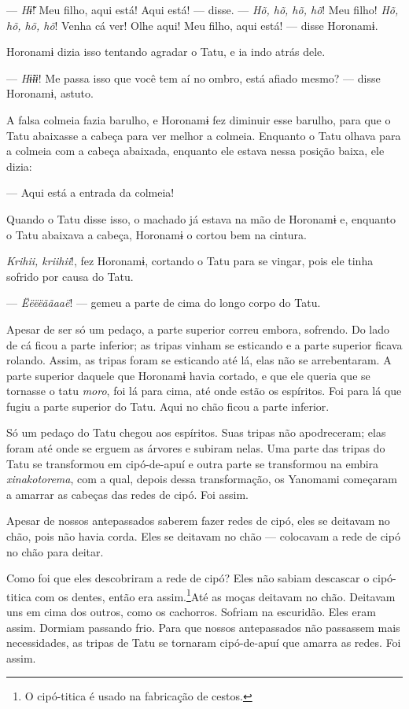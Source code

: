 --- \textit{Hɨ̃}! Meu filho, aqui está! Aqui está! --- disse. --- \textit{Hõ, hõ, hõ,
hõ}! Meu filho! \textit{Hõ, hõ, hõ, hõ}! Venha cá ver! Olhe aqui! Meu filho, aqui
está! --- disse Horonamɨ. 

Horonamɨ dizia isso tentando agradar o Tatu, e ia indo atrás dele. 

--- \textit{Hɨ̃ɨɨ}! Me passa isso que você tem aí no ombro, está afiado
mesmo? --- disse Horonamɨ, astuto. 

A falsa colmeia fazia barulho, e Horonamɨ fez diminuir esse barulho,
para que o Tatu abaixasse a cabeça para ver melhor a colmeia. Enquanto o
Tatu olhava para a colmeia com a cabeça abaixada, enquanto ele estava
nessa posição baixa, ele dizia:

--- Aqui está a entrada da colmeia! 

Quando o Tatu disse isso, o machado já estava na mão de Horonamɨ e,
enquanto o Tatu abaixava a cabeça, Horonamɨ o cortou bem na cintura. 

\textit{Krihii, kriihii}!, fez Horonamɨ, cortando o Tatu para se vingar, pois
ele tinha sofrido por causa do Tatu. 

--- \textit{Ëëëëããaaë}! --- gemeu a parte de cima do longo corpo do Tatu. 

Apesar de ser só um pedaço, a parte superior correu embora, sofrendo. Do
lado de cá ficou a parte inferior; as tripas vinham se esticando e a
parte superior ficava rolando. Assim, as tripas foram se esticando até
lá, elas não se arrebentaram. A parte superior daquele que Horonamɨ
havia cortado, e que ele queria que se tornasse o tatu \textit{moro}, foi
lá para cima, até onde estão os espíritos. Foi para lá que fugiu a parte
superior do Tatu. Aqui no chão ficou a parte inferior. 

Só um pedaço do Tatu chegou aos espíritos. Suas tripas não apodreceram;
elas foram até onde se erguem as árvores e subiram nelas. Uma parte das
tripas do Tatu se transformou em cipó-de-apuí e outra parte se
transformou na embira \textit{xinakotorema}, com a qual, depois dessa
transformação, os Yanomami começaram a amarrar as cabeças das redes de
cipó. Foi assim.

Apesar de nossos antepassados saberem fazer redes de cipó, eles se
deitavam no chão, pois não havia corda. Eles se deitavam no chão ---
colocavam a rede de cipó no chão para deitar. 

Como foi que eles descobriram a rede de cipó? Eles não sabiam descascar
o cipó-titica com os dentes, então era assim.\footnote{O cipó-titica é usado na fabricação de cestos.}Até as
moças deitavam no chão. Deitavam uns em cima dos outros, como os
cachorros. Sofriam na escuridão. Eles eram assim. Dormiam passando frio.
Para que nossos antepassados não passassem mais necessidades, as tripas
de Tatu se tornaram cipó-de-apuí que amarra as redes. Foi assim. 

